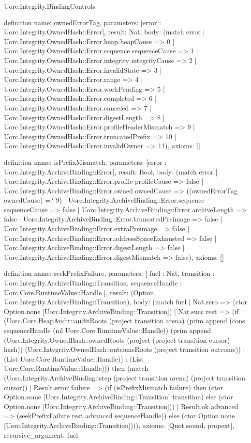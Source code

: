 \begin{lexlean}{Uorc.Integrity.BindingControls}
\begin{semanticmodule}
definition{
  name: ownedErrorTag,
  parameters: [error : Uorc.Integrity.OwnedHash::Error],
  result: Nat,
  body: (match error
    | Uorc.Integrity.OwnedHash::Error.heap heapCause => 0
    | Uorc.Integrity.OwnedHash::Error.sequence sequenceCause => 1
    | Uorc.Integrity.OwnedHash::Error.integrity integrityCause => 2
    | Uorc.Integrity.OwnedHash::Error.invalidState => 3
    | Uorc.Integrity.OwnedHash::Error.range => 4
    | Uorc.Integrity.OwnedHash::Error.workPending => 5
    | Uorc.Integrity.OwnedHash::Error.completed => 6
    | Uorc.Integrity.OwnedHash::Error.canceled => 7
    | Uorc.Integrity.OwnedHash::Error.digestLength => 8
    | Uorc.Integrity.OwnedHash::Error.profileHeaderMismatch => 9
    | Uorc.Integrity.OwnedHash::Error.truncatedPrefix => 10
    | Uorc.Integrity.OwnedHash::Error.invalidOwner => 11),
  axioms: []
}

definition{
  name: isPrefixMismatch,
  parameters: [error : Uorc.Integrity.ArchiveBinding::Error],
  result: Bool,
  body: (match error
    | Uorc.Integrity.ArchiveBinding::Error.profile profileCause => false
    | Uorc.Integrity.ArchiveBinding::Error.owned ownedCause => ((ownedErrorTag ownedCause) =? 9)
    | Uorc.Integrity.ArchiveBinding::Error.sequence sequenceCause => false
    | Uorc.Integrity.ArchiveBinding::Error.archiveLength => false
    | Uorc.Integrity.ArchiveBinding::Error.truncatedPreimage => false
    | Uorc.Integrity.ArchiveBinding::Error.extraPreimage => false
    | Uorc.Integrity.ArchiveBinding::Error.addressSpaceExhausted => false
    | Uorc.Integrity.ArchiveBinding::Error.digestLength => false
    | Uorc.Integrity.ArchiveBinding::Error.digestMismatch => false),
  axioms: []
}

definition{
  name: seekPrefixFailure,
  parameters: [
    fuel : Nat,
    transition : Uorc.Integrity.ArchiveBinding::Transition,
    sequenceHandle : Uorc.Core.RuntimeValue::Handle
  ],
  result: (Option Uorc.Integrity.ArchiveBinding::Transition),
  body: (match fuel
    | Nat.zero => (ctor Option.none [Uorc.Integrity.ArchiveBinding::Transition])
    | Nat.succ rest => (if (Uorc.Core.HeapAudit::auditRoots (project transition arena) (prim append (cons sequenceHandle (nil Uorc.Core.RuntimeValue::Handle)) (prim append (Uorc.Integrity.OwnedHash::ownedRoots (project (project transition cursor) hash)) (Uorc.Integrity.OwnedHash::outcomeRoots (project transition outcome)) : (List Uorc.Core.RuntimeValue::Handle)) : (List Uorc.Core.RuntimeValue::Handle))) then (match (Uorc.Integrity.ArchiveBinding::step (project transition arena) (project transition cursor))
      | Result.error failure => (if (isPrefixMismatch failure) then (ctor Option.some [Uorc.Integrity.ArchiveBinding::Transition] transition) else (ctor Option.none [Uorc.Integrity.ArchiveBinding::Transition]))
      | Result.ok advanced => (seekPrefixFailure rest advanced sequenceHandle)) else (ctor Option.none [Uorc.Integrity.ArchiveBinding::Transition]))),
  axioms: [Quot.sound, propext],
  recursive_argument: fuel
}


\end{semanticmodule}
\end{lexlean}
